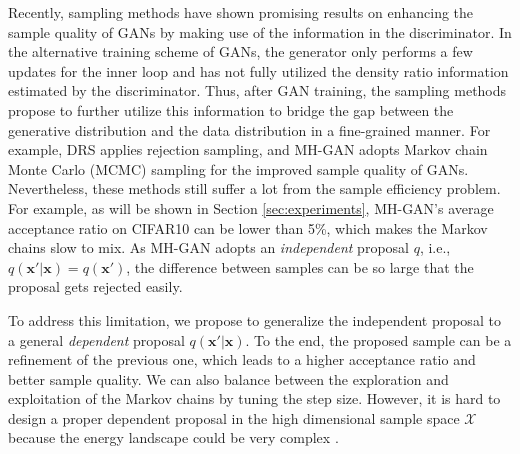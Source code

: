\documentclass{article} %
\newcommand{\bx}{\mathbf{x}}
\newcommand{\cX}{\mathcal{X}}
\newcommand{\<}{\left\langle}
\renewcommand{\>}{\right\rangle}
\begin{document}
Recently, sampling methods have shown promising results on enhancing the sample quality of GANs by making use of 
the information in the discriminator.
In the alternative training scheme of GANs, the generator only performs a few updates for the inner loop and has not fully utilized the density ratio information estimated by the discriminator. Thus, after GAN training, the sampling methods propose to further utilize this information to bridge the gap between the generative distribution and the data distribution in a fine-grained manner.
For example, DRS \citep{azadi2019discriminator} applies rejection sampling, and MH-GAN \citep{turner2019metropolis} adopts Markov chain Monte Carlo (MCMC) sampling for the improved sample quality of GANs. Nevertheless, these methods still suffer a lot from the sample efficiency problem. For example, as will be shown in Section \ref{sec:experiments}, MH-GAN's average acceptance ratio on CIFAR10 can be lower than 5\%, which makes the Markov chains slow to mix. As MH-GAN adopts an \emph{independent} proposal $q$, i.e., $q(\bx'|\bx)=q(\bx')$, the difference between samples can be so large that the proposal gets rejected easily. 

To address this limitation, we propose to generalize the independent proposal to a general \emph{dependent} proposal $q(\bx'|\bx)$. To the end, the proposed sample can be a refinement of the previous one, which leads to a higher acceptance ratio and better sample quality. We can also balance between the exploration and exploitation of the Markov chains by tuning the step size. However, it is hard to design a proper dependent proposal in the high dimensional sample space $\cX$ because the energy landscape could be very complex \citep{neal2010MCMC}. 
\end{document}

